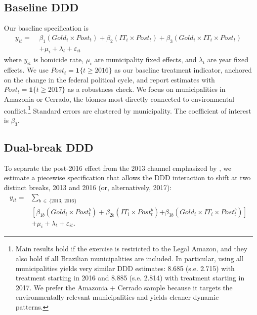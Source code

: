 \documentclass[preprint,12pt]{elsarticle}
\begin{document}
\subsection{Baseline DDD}
Our baseline specification is
\begin{equation}
\begin{aligned}
y_{it} =\;& \beta_1(Gold_i \times Post_t) + \beta_2(IT_i \times Post_t) + \beta_3(Gold_i \times IT_i \times Post_t) \\
&+ \mu_i + \lambda_t + \varepsilon_{it}
\end{aligned}
\end{equation}
where \(y_{it}\) is homicide rate, \(\mu_i\) are municipality fixed effects, and \(\lambda_t\) are year fixed effects. We use $Post_t = \mathbf{1}\{t \geq 2016\}$ as our baseline treatment indicator, anchored on the change in the federal political cycle, and report estimates with $Post_t = \mathbf{1}\{t \geq 2017\}$ as a robustness check. We focus on municipalities in Amazonia or Cerrado, the biomes most directly connected to environmental conflict.\footnote{Main results hold if the exercise is restricted to the Legal Amazon, and they also hold if all Brazilian municipalities are included. In particular, using all municipalities yields very similar DDD estimates: 8.685 (s.e. 2.715) with treatment starting in 2016 and 8.885 (s.e. 2.814) with treatment starting in 2017. We prefer the Amazonia $+$ Cerrado sample because it targets the environmentally relevant municipalities and yields cleaner dynamic patterns.} Standard errors are clustered by municipality. The coefficient of interest is \(\beta_3\).

\subsection{Dual-break DDD}
To separate the post-2016 effect from the 2013 channel emphasized by \citet{pereira_pucci_2024}, we estimate a piecewise specification that allows the DDD interaction to shift at two distinct breaks, 2013 and 2016 (or, alternatively, 2017):
\begin{equation}
\begin{aligned}
y_{it} = & \sum_{b \ \in \ \{2013, \ 2016\}} \\
&\left[ \beta_{1b}(Gold_i \times Post^b_t) + \beta_{2b}(IT_i \times Post^b_t) \right. \left. + \beta_{3b}(Gold_i \times IT_i \times Post^b_t) \right] \\
&+ \mu_i + \lambda_t + \varepsilon_{it}.
\end{aligned}
\end{equation}
\end{document}
